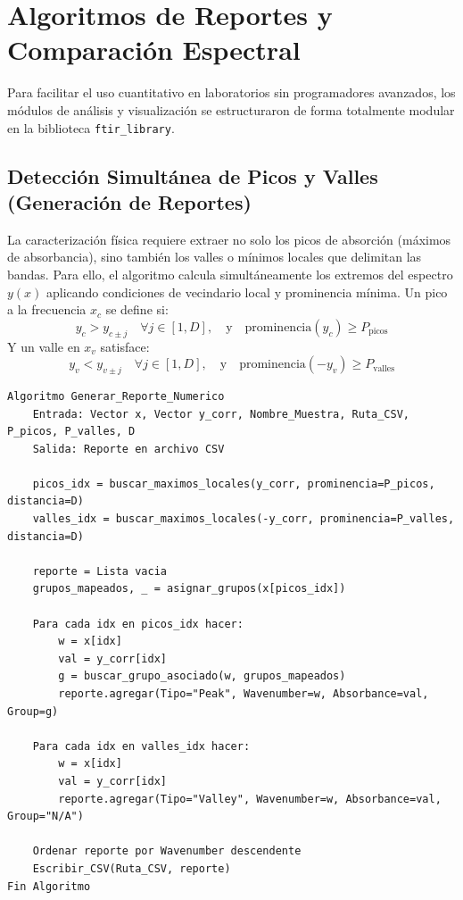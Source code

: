 \documentclass[a4paper,11pt]{article}
\begin{document}
\section{Algoritmos de Reportes y Comparación Espectral}
Para facilitar el uso cuantitativo en laboratorios sin programadores avanzados, los módulos de análisis y visualización se estructuraron de forma totalmente modular en la biblioteca \texttt{ftir\_library}.

\subsection{Detección Simultánea de Picos y Valles (Generación de Reportes)}
La caracterización física requiere extraer no solo los picos de absorción (máximos de absorbancia), sino también los valles o mínimos locales que delimitan las bandas. Para ello, el algoritmo calcula simultáneamente los extremos del espectro $y(x)$ aplicando condiciones de vecindario local y prominencia mínima. Un pico a la frecuencia $x_c$ se define si:
\begin{equation}
    y_c > y_{c \pm j} \quad \forall j \in [1, D], \quad \text{y} \quad \text{prominencia}(y_c) \ge P_{\text{picos}}
\end{equation}
Y un valle en $x_v$ satisface:
\begin{equation}
    y_v < y_{v \pm j} \quad \forall j \in [1, D], \quad \text{y} \quad \text{prominencia}(-y_v) \ge P_{\text{valles}}
\end{equation}

\begin{lstlisting}[caption=Algoritmo de Detección de Extremos y Generación de Reportes]
Algoritmo Generar_Reporte_Numerico
    Entrada: Vector x, Vector y_corr, Nombre_Muestra, Ruta_CSV, P_picos, P_valles, D
    Salida: Reporte en archivo CSV

    picos_idx = buscar_maximos_locales(y_corr, prominencia=P_picos, distancia=D)
    valles_idx = buscar_maximos_locales(-y_corr, prominencia=P_valles, distancia=D)
    
    reporte = Lista vacia
    grupos_mapeados, _ = asignar_grupos(x[picos_idx])
    
    Para cada idx en picos_idx hacer:
        w = x[idx]
        val = y_corr[idx]
        g = buscar_grupo_asociado(w, grupos_mapeados)
        reporte.agregar(Tipo="Peak", Wavenumber=w, Absorbance=val, Group=g)
        
    Para cada idx en valles_idx hacer:
        w = x[idx]
        val = y_corr[idx]
        reporte.agregar(Tipo="Valley", Wavenumber=w, Absorbance=val, Group="N/A")
        
    Ordenar reporte por Wavenumber descendente
    Escribir_CSV(Ruta_CSV, reporte)
Fin Algoritmo
\end{lstlisting}
\end{document}
